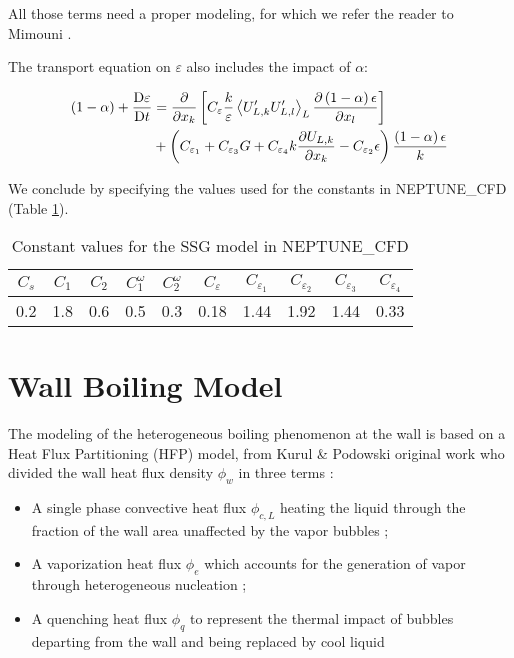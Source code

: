 \npar

All those terms need a proper modeling, for which we refer the reader to Mimouni \etal \cite{mimouni_combined_2011}.

\npar

The transport equation on $\varepsilon$ also includes the impact of $\alpha$:


\begin{align}
\left( 1-\alpha \right)+\frac{\mathrm{D}\varepsilon}{\mathrm{D}t}  &= \frac{\partial}{\partial x_{k}}\left[  C_{\varepsilon} \frac{k}{\varepsilon}\left< U'_{L,k}U'_{L,l} \right>_{L}  \frac{\partial \left( 1-\alpha \right) \epsilon}{\partial x_{l}}  \right] \\
&+ \left( C_{\varepsilon_{1}} + C_{\varepsilon_{3}}G + C_{\varepsilon_{4}}k\frac{\partial U_{L,k}}{\partial x_{k}} - C_{\varepsilon_{2}}\epsilon  \right) \frac{\left( 1-\alpha \right)\epsilon}{k}
\end{align}

\npar

We conclude by specifying the values used for the constants in NEPTUNE\_CFD (Table \ref{tab:ncfd_ssg_constants}).


\begin{table}[!h]
\centering
\begin{tabular}{c c c c c c c c c c} 
\hline
$C_{s}$ & $C_{1}$ & $C_{2}$ & $C_{1}^{\omega}$ & $C_{2}^{\omega}$ & $C_{\varepsilon}$ & $C_{\varepsilon_{1}}$ & $C_{\varepsilon_{2}}$ & $C_{\varepsilon_{3}}$ & $C_{\varepsilon_{4}}$ \\
\hline
0.2 & 1.8 & 0.6 & 0.5 & 0.3 & 0.18 & 1.44 & 1.92 & 1.44 & 0.33\\
\hline
\end{tabular}

\caption{Constant values for the SSG model in NEPTUNE\_CFD}
\label{tab:ncfd_ssg_constants}

\end{table}




\section{Wall Boiling Model}
\label{sec:ncfd_HFP}

The modeling of the heterogeneous boiling phenomenon at the wall is based on a Heat Flux Partitioning (HFP) model,  from Kurul \& Podowski original work\cite{kurul_multidimensional_1990} who divided the wall heat flux density $\phi_{w}$ in three terms  :

\begin{itemize}
\item A single phase convective heat flux $\phi_{c,L}$ heating the liquid through the fraction of the wall area unaffected by the vapor bubbles ;
\item A vaporization heat flux $\phi_{e}$ which accounts for the generation of vapor through heterogeneous nucleation ;
\item A quenching heat flux $\phi_{q}$ to represent the thermal impact of bubbles departing from the wall and being replaced by cool liquid
\end{itemize}

